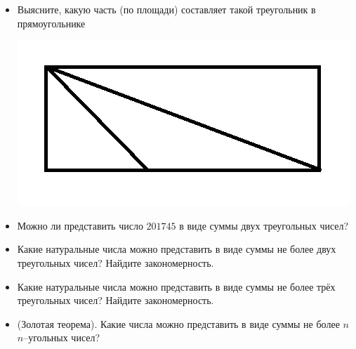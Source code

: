 \documentclass[10pt]{scrbook} \usepackage{modules/nonstahp_book}
\begin{document}
\begin{itemize}
\begin{center}
\end{center}
\item Выясните, какую часть (по площади) составляет такой треугольник в прямоугольнике
\begin{center}
\includegraphics[width=0.7\linewidth]{Area3.png}%
\end{center}
\end{itemize}






\begin{itemize}
\item Можно ли представить число $201745$ в виде суммы двух треугольных чисел?
\item Какие натуральные числа можно представить в виде суммы не более двух треугольных чисел? Найдите закономерность.
\item Какие натуральные числа можно представить в виде суммы не более трёх треугольных чисел? Найдите закономерность.
\item (Золотая теорема). Какие числа можно представить в виде суммы не более $n$ $n$--угольных чисел?
\end{itemize}
\end{document}
